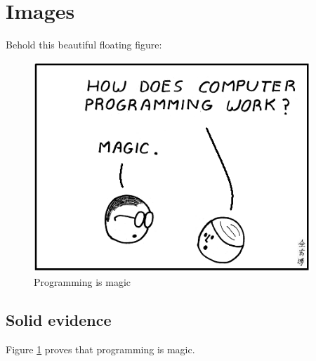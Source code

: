 \lipsum[1]

\section{Images}
Behold this beautiful floating figure:

\begin{figure}[H]
	\caption[Programming is magic]{Programming is magic} 
	\label{fig:programmingMagic} 
	\centering
	\includegraphics[height=300px]{images/programming.png}

\end{figure}

\subsection{Solid evidence}
Figure \ref{fig:programmingMagic} proves that programming is magic.

